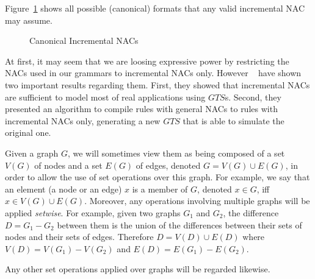 \begin{example}Figure~\ref{fig:process:incremental-nacs} shows all possible (canonical) formats that any valid incremental NAC may assume.

\begin{figure}[!ht]
  \centering
  \caption{Canonical Incremental NACs}\label{fig:process:incremental-nacs}
\end{figure}
\end{example}

At first, it may seem that we are loosing expressive power by restricting the NACs used in our grammars to incremental NACs only. However ~\cite{Corradini2013} have shown two important results regarding them. First, they showed that incremental NACs are sufficient to model most of real applications using $GTS$s. Second, they presented an algorithm to compile rules with general NACs to rules with incremental NACs only, generating a new $GTS$ that is able to simulate the original one.

  \begin{notation} Given a graph $G$, we will sometimes view them as being composed of a set $V(G)$ of nodes and a set $E(G)$ of edges, denoted \mbox{$G = V(G) \cup E(G)$}, in order to allow the use of set operations over this graph.
    For example, we say that an element (a node or an edge) $x$ is a member of $G$, denoted $x \in G$, iff $x \in V(G) \cup E(G)$. 
      Moreover, any operations involving multiple graphs will be applied \emph{setwise}. For example, given two graphs $G_1$ and $G_2$, the difference $D = G_1 - G_2$ between them is the union of the differences between their sets of nodes and their sets of edges. Therefore $D = V(D) \cup E(D)$ where $V(D) = V(G_1) - V(G_2)$ and $E(D) = E(G_1) - E(G_2)$.

    Any other set operations applied over graphs will be regarded likewise.

\end{notation}

